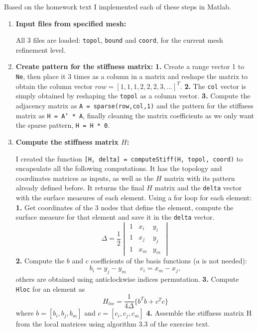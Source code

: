 \documentclass[a4paper, 11pt]{article}
\begin{document}
			
				Based on the homework text I implemented each of these steps in Matlab.
			
			\begin{enumerate}
				\item \textbf{Input files from specified mesh:} 
				
					All 3 files are loaded: \texttt{topol}, \texttt{bound} and \texttt{coord}, for the current mesh refinement level.	
				
				\item \textbf{Create pattern for the stiffness matrix:} 
					\subitem \textbf{1.} Create a range vector 1 to \texttt{Ne}, then place it 3 times as a column in a matrix and reshape the matrix to obtain the column vector $ row = [1,1,1,2,2,2,3,\ldots]^T $. 
					\subitem \textbf{2.} The \texttt{col} vector is simply obtained by reshaping the \texttt{topol} as a column vector. 
					\subitem \textbf{3.} Compute the adjacency matrix as \texttt{A = sparse(row,col,1)} and the pattern for the stiffness matrix as \texttt{H = A' * A}, finally cleaning the matrix coefficients as we only want the sparse pattern, \texttt{H = H * 0}.
				
				\item \textbf{Compute the stiffness matrix $H$:}
				
					I created the function \texttt{[H, delta] = computeStiff(H, topol, coord)} to encapsulate all the following computations.
					It has the topology and coordinates matrices as inputs, as well as the $ H $ matrix with its pattern already defined before.
					It returns the final $ H $ matrix and the \texttt{delta} vector with the surface measures of each element.
					Using a for loop for each element:
					\subitem \textbf{1.} Get coordinates of the 3 nodes that define the element, compute the surface measure for that element and save it in the \texttt{delta} vector.
					$$ \Delta = \frac{1}{2} \begin{vmatrix} 1 & x_i & y_i \\ 1 & x_j & y_j \\ 1 & x_m & y_m \end{vmatrix} $$
					\subitem \textbf{2.} Compute the $ b $ and $ c  $ coefficients of the basis functions ($a$ is not needed): 
					$$  b_i = y_j - y_m  \qquad c_i = x_m - x_j ,$$ others are obtained using anticlockwise indices permutation.
					\subitem \textbf{3.} Compute \texttt{Hloc} for an element as 
					$$ H_{loc} = \frac{1}{4\Delta}\{ b^Tb + c^Tc \} $$ 
					where $ b = [b_i, b_j, b_m]$ and $ c = [c_i, c_j, c_m]$
					\subitem \textbf{4.} Assemble the stiffness matrix H from the local matrices using algorithm 3.3 of the exercise text.
				

\end{enumerate}
\end{document}
